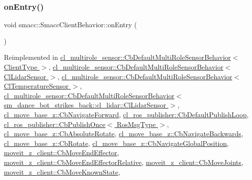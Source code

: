 \subsubsection{\texorpdfstring{on\+Entry()}{onEntry()}}
{\footnotesize\ttfamily void smacc\+::\+Smacc\+Client\+Behavior\+::on\+Entry (\begin{DoxyParamCaption}{ }\end{DoxyParamCaption})\hspace{0.3cm}{\ttfamily [virtual]}}



Reimplemented in \hyperlink{classcl__multirole__sensor_1_1CbDefaultMultiRoleSensorBehavior_a5ac29f93cc91e23715f51ade94467cae}{cl\+\_\+multirole\+\_\+sensor\+::\+Cb\+Default\+Multi\+Role\+Sensor\+Behavior$<$ Client\+Type $>$}, \hyperlink{classcl__multirole__sensor_1_1CbDefaultMultiRoleSensorBehavior_a5ac29f93cc91e23715f51ade94467cae}{cl\+\_\+multirole\+\_\+sensor\+::\+Cb\+Default\+Multi\+Role\+Sensor\+Behavior$<$ Cl\+Lidar\+Sensor $>$}, \hyperlink{classcl__multirole__sensor_1_1CbDefaultMultiRoleSensorBehavior_a5ac29f93cc91e23715f51ade94467cae}{cl\+\_\+multirole\+\_\+sensor\+::\+Cb\+Default\+Multi\+Role\+Sensor\+Behavior$<$ Cl\+Temperature\+Sensor $>$}, \hyperlink{classcl__multirole__sensor_1_1CbDefaultMultiRoleSensorBehavior_a5ac29f93cc91e23715f51ade94467cae}{cl\+\_\+multirole\+\_\+sensor\+::\+Cb\+Default\+Multi\+Role\+Sensor\+Behavior$<$ sm\+\_\+dance\+\_\+bot\+\_\+strikes\+\_\+back\+::cl\+\_\+lidar\+::\+Cl\+Lidar\+Sensor $>$}, \hyperlink{classcl__move__base__z_1_1CbNavigateForward_af9a2e49071de287922c3f5963a079b95}{cl\+\_\+move\+\_\+base\+\_\+z\+::\+Cb\+Navigate\+Forward}, \hyperlink{classcl__ros__publisher_1_1CbDefaultPublishLoop_a6e6cfb477cbefc510ca7b55a061545e4}{cl\+\_\+ros\+\_\+publisher\+::\+Cb\+Default\+Publish\+Loop}, \hyperlink{classcl__ros__publisher_1_1CbPublishOnce_afaed71bc2694ec1837278d5f931a76e1}{cl\+\_\+ros\+\_\+publisher\+::\+Cb\+Publish\+Once$<$ Ros\+Msg\+Type $>$}, \hyperlink{classcl__move__base__z_1_1CbAbsoluteRotate_a10418ea360809fa649d295716b152b2b}{cl\+\_\+move\+\_\+base\+\_\+z\+::\+Cb\+Absolute\+Rotate}, \hyperlink{classcl__move__base__z_1_1CbNavigateBackwards_a545a5282f0ef6b0080b46002d6037567}{cl\+\_\+move\+\_\+base\+\_\+z\+::\+Cb\+Navigate\+Backwards}, \hyperlink{classcl__move__base__z_1_1CbRotate_a316ee51ecfd3f10fd1edae0d7d3b26c0}{cl\+\_\+move\+\_\+base\+\_\+z\+::\+Cb\+Rotate}, \hyperlink{classcl__move__base__z_1_1CbNavigateGlobalPosition_a66d8b0555ef2945bc108dcd5171be292}{cl\+\_\+move\+\_\+base\+\_\+z\+::\+Cb\+Navigate\+Global\+Position}, \hyperlink{classmoveit__z__client_1_1CbMoveEndEffector_a5306018b432c9d8f8a31823f6b317d84}{moveit\+\_\+z\+\_\+client\+::\+Cb\+Move\+End\+Effector}, \hyperlink{classmoveit__z__client_1_1CbMoveEndEffectorRelative_ae425a51d23933a13a87df9cd26f0fc99}{moveit\+\_\+z\+\_\+client\+::\+Cb\+Move\+End\+Effector\+Relative}, \hyperlink{classmoveit__z__client_1_1CbMoveJoints_a512e97e94ab05ee12837433e5d921095}{moveit\+\_\+z\+\_\+client\+::\+Cb\+Move\+Joints}, \hyperlink{classmoveit__z__client_1_1CbMoveKnownState_a449644896e100c8233d58cb3a57bcff4}{moveit\+\_\+z\+\_\+client\+::\+Cb\+Move\+Known\+State}, 